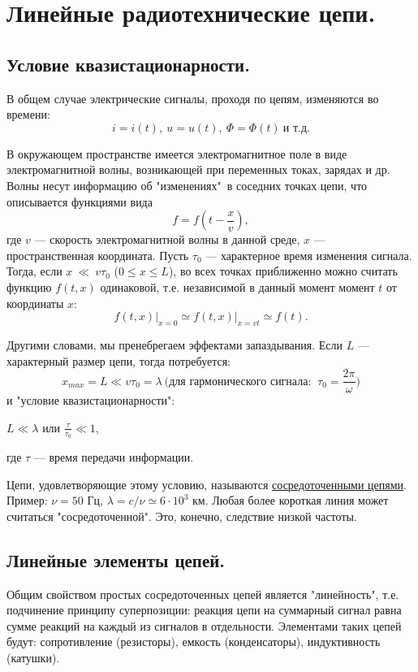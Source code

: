 \documentclass[../main/main.tex]{subfiles}
\begin{document}
\section{Линейные радиотехнические цепи.}

\subsection{Условие квазистационарности.}
В общем случае электрические сигналы, проходя по цепям, изменяются во времени: 
$$i = i(t),~u=u(t),~\Phi = \Phi(t)~\text{и т.д.}$$

В окружающем пространстве имеется электромагнитное поле в виде электромагнитной волны, возникающей при переменных токах, зарядах и др. Волны несут информацию об "изменениях"\ в соседних точках цепи, что описывается функциями вида
$$f = f(t - \frac{x}{v}),$$
где $v$ --- скорость электромагнитной волны в данной среде, $x$ --- пространственная координата. Пусть $\tau_0$ --- характерное время изменения сигнала. Тогда, если $x~\ll~v\tau_0$ ($0\leqslant x \leqslant L$), во всех точках приближенно можно считать функцию $f(t, x)$ одинаковой, т.е. независимой в данный момент момент $t$ от координаты $x$: 
$$f(t, x) \bigg|_{x=0} \simeq f(t, x)\bigg|_{x=vt}\simeq f(t).$$

Другими словами, мы пренебрегаем эффектами запаздывания. Если $L$ --- характерный размер цепи, тогда потребуется:
$$x_{max} = L \ll v\tau_0 = \lambda~\text{(для гармонического сигнала: }~\tau_0=\frac{2\pi}{\omega})$$
и "условие квазистационарности": 
\begin{center}
$\boxed{L \ll \lambda}$ или $\frac{\tau}{\tau_0} \ll 1$,
\end{center}
где $\tau$ --- время передачи информации.

Цепи, удовлетворяющие этому условию, называются \underline{сосредоточенными цепями}. Пример: $\nu = 50$ Гц, $\lambda = c/\nu \simeq 6\cdot10^3$ км. Любая более короткая линия может считаться "сосредоточенной". Это, конечно, следствие низкой частоты.

\subsection{Линейные элементы цепей.}

Общим свойством простых сосредоточенных цепей является "линейность", т.е. подчинение принципу суперпозиции: реакция цепи на суммарный сигнал равна сумме реакций на каждый из сигналов в отдельности. Элементами таких цепей будут: сопротивление (резисторы), емкость (конденсаторы), индуктивность (катушки).
\end{document}
